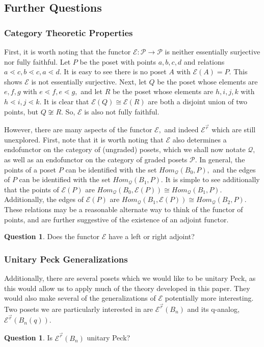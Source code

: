 \documentclass[10 pt]{amsart}
\theoremstyle{plain}
\theoremstyle{definition}
\newtheorem{question}[thm]{Question}
\theoremstyle{remark}
\numberwithin{equation}{section}
\newcommand\ssec{\subsection}
\newcommand\sssec{\subsubsection}
\renewcommand{\vec}[1]{\overrightarrow{#1}}
\begin{document}
\ssec{Further Questions}

\sssec{Category Theoretic Properties}

First, it is worth noting that the functor $\mathcal E:\mathcal P \rightarrow \mathcal P$ is neither essentially surjective nor fully faithful. Let $P$ be the poset with points $a,b,c,d$ and relations $a \lessdot c, b \lessdot c, a \lessdot d.$ It is easy to see there is no poset $A$ with $\mathcal E(A) = P.$ This shows $\mathcal E$ is not essentially surjective. Next, let $Q$ be the poset whose elements are $e,f,g$ with $e \lessdot f, e \lessdot g,$ and let $R$ be the poset whose elements are $h,i,j,k$ with $h \lessdot i, j \lessdot k.$ It is clear that $\mathcal E(Q) \cong \mathcal E(R)$ are both a disjoint union of two points, but $Q \not \cong R.$ So, $\mathcal E$ is also not fully faithful.

However, there are many aspects of the functor $\mathcal E,$ and indeed $\mathcal E^{\vec r}$ which are still unexplored. First, note that it is worth noting that $\mathcal E$ also determines a endofunctor on the category of (ungraded) posets, which we shall now notate $\mathcal Q,$ as well as an endofunctor on the category of graded posets $\mathcal P.$ In general, the points of a poset $P$ can be identified with the set $Hom_{\mathcal Q}(B_0,P),$ and the edges of $P$ can be identified with the set $Hom_{\mathcal Q}(B_1,P).$ It is simple to see additionally that the points of $\mathcal E(P)$ are $Hom_{\mathcal Q}(B_0,\mathcal E(P)) \cong Hom_{\mathcal Q}(B_1,P).$ Additionally, the edges of $\mathcal E(P)$ are $Hom_{\mathcal Q}(B_1,\mathcal E(P)) \cong Hom_{\mathcal Q}(B_2,P).$ These relations may be a reasonable alternate way to think of the functor of points, and are further suggestive of the existence of an adjoint functor.

\begin{question}
Does the functor $\mathcal E$ have a left or right adjoint?
\end{question}

\sssec{Unitary Peck Generalizations}

Additionally, there are several posets which we would like to be unitary  
Peck, as this would allow us to apply much of the theory developed in this paper. They would also make several of the generalizations of $\mathcal E$ potentially more interesting. Two posets we are particularly interested in are $\mathcal E^{\vec r}(B_n)$ and its q-analog, $\mathcal E^{\vec r}(B_n(q)).$

\begin{question}
Is $\mathcal E^{\vec r}(B_n)$ unitary Peck?
\end{question}
\end{document}
